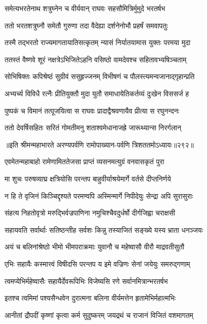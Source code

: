 \twolineshloka
{समेत्यभरतेनाथ शत्रुघ्नेन च वीर्यवान्}
{राघवः सहसौमित्रिर्मुमुदे भरतर्षभ}


\twolineshloka
{ततो भरतशत्रुघ्नौ समेतौ गुरुणा तदा}
{वैदेह्या दर्शनेनोभौ प्रहर्षं समवापतुः}


\twolineshloka
{तस्मै तद्भरतो राज्यमागतायातिसत्कृतम्}
{न्यासं निर्यातयामास युक्तः परमया मुदा}


\twolineshloka
{ततस्तं वैष्णवे शूरं नक्षत्रेऽभिजितेऽहनि}
{वसिष्ठो वामदेवश्च सहितावभ्यषिञ्चताम्}


\twolineshloka
{सोभिषिक्तः कपिश्रेष्ठं सुग्रीवं ससुहृज्जनम्}
{विभीषणं च पौलस्त्यमन्वजानाद्गृहान्प्रति}


\twolineshloka
{अभ्यर्च्य विविधै रत्नैः प्रीतियुक्तौ मुदा युतौ}
{समाधायेतिकर्तव्यं दुःखेन विससर्ज ह}


\twolineshloka
{पुष्पकं च विमानं तत्पूजयित्वा स राघवः}
{प्रादाद्वैश्रवणायैव प्रीत्या स रघुनन्दनः}


\twolineshloka
{ततो देवर्षिसहितः सरितं गोमतीमनु}
{शताश्वमेधानाजह्रे जारूथ्यान्स निरर्गलान्}


॥इति श्रीमन्महाभारते अरण्यपर्वणि रामोपाख्यान-पर्वणि त्रिशततमोऽध्यायः॥२९२॥




\twolineshloka
{एवमेतन्महाबाहो रामेणामिततेजसा}
{प्राप्तं व्यसनमत्युग्रं वनवासकृतं पुरा}


\twolineshloka
{मा शुचः परुषव्याघ्र क्षत्रियोसि परन्तप}
{बाहुवीर्याश्रयेमार्गे वर्तसे दीप्तनिर्णये}


\twolineshloka
{न हि ते वृजिनं किञ्चिद्दृश्यते परमण्वपि}
{अस्मिन्मार्गे निपीदेयुः सेन्द्रा अपि सुरासुराः}


\twolineshloka
{संहत्य निहतोवृत्रो मरुद्भिर्वज्रपाणिना}
{नमुचिश्चैवदुर्धर्षो दीर्गजिह्वा चराक्षसी}


\twolineshloka
{सहायवति सर्वार्थाः सतिष्ठन्तीह सर्वशः}
{किन्नु तस्याजितं सङ्ख्ये यस्य भ्राता धनञ्जयः}


\twolineshloka
{अयं च बलिनांश्रेष्ठो भीमो भीमपराक्रमाः}
{युवानौ च महेष्वासौ वीरौ माद्रवतीसुतौ}


\twolineshloka
{एभिः सहायैः कस्मात्त्वं विषीदसि परन्तप}
{य इमे वज्रिणः सेनां जयेयुः समरुद्गणाम्}


\twolineshloka
{त्वमप्येभिर्महेष्वासैः सहायैर्देवरूपिभिः}
{विजेष्यसि रणे सर्वानमित्रान्भरतर्षभ}


\twolineshloka
{इतश्च त्वमिमां पश्यसैन्धवेन दुरात्मना}
{बलिना वीर्यमत्तेन हृतामेभिर्महात्मभिः}


\twolineshloka
{आनीतां द्रौपदीं कृष्णां कृत्वा कर्म सुदुष्करम्}
{जयद्रथं च राजानं विजितं वशमागतम्}


